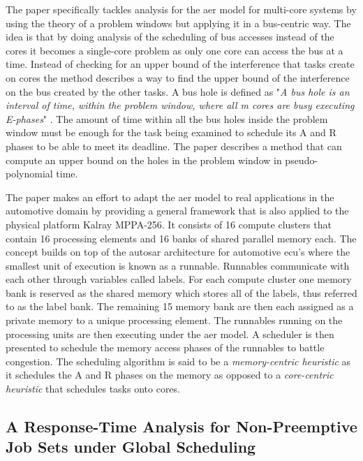 \documentclass{kththesis}
\begin{document}
The paper \parencite{maia_schedulability_2017} specifically tackles analysis for the \acrshort{aer}
model for multi-core systems by using the theory of a problem windows but applying it in a
bus-centric way. The idea is that by doing analysis of the scheduling of bus accesses instead of the
cores it becomes a single-core problem as only one core can access the bus at a time.  Instead of
checking for an upper bound of the interference that tasks create on cores the method describes a
way to find the upper bound of the interference on the bus created by the other tasks. A bus hole is
defined as "\textit{A bus hole is an interval of time, within the problem window, where all m cores
are busy executing E-phases}" \parencite{maia_schedulability_2017}. The amount of time within all
the bus holes inside the problem window must be enough for the task being examined to schedule its A
and R phases to be able to meet its deadline. The paper describes a method that can compute an upper
bound on the holes in the problem window in pseudo-polynomial time.

The paper \parencite{becker_contention-free_2016} makes an effort to adapt the \acrshort{aer} model
to real applications in the automotive domain by providing a general framework that is also applied
to the physical platform Kalray MPPA-256. It consists of 16 compute clusters that contain 16
processing elements and 16 banks of shared parallel memory each. The concept builds on top of the
\acrshort{autosar} architecture for automotive \acrshort{ecu}'s where the smallest unit of execution
is known as a runnable. Runnables communicate with each other through variables called labels. For
each compute cluster one memory bank is reserved as the shared memory which stores all of the
labels, thus referred to as the label bank. The remaining 15 memory bank are then each assigned as a
private memory to a unique processing element. The runnables running on the processing units are
then executing under the \acrshort{aer} model. A scheduler is then presented to schedule the memory
access phases of the runnables to battle congestion. The scheduling algorithm is said to be a
\textit{memory-centric heuristic} as it schedules the A and R phases on the memory as opposed to a
\textit{core-centric heuristic} that schedules tasks onto cores.


\subsection{A Response-Time Analysis for Non-Preemptive Job Sets under Global
Scheduling}\label{subsec:artafnpjsug}
\end{document}

